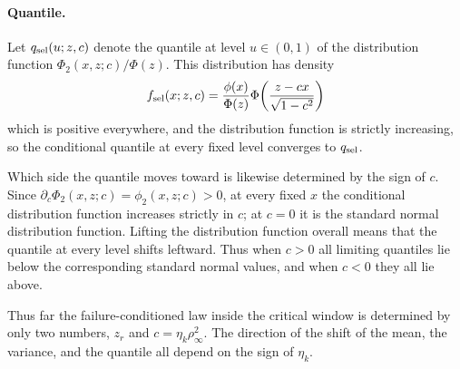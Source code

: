 \paragraph{Quantile.}
Let $q_{\rm sel}(u;z,c)$ denote the quantile at level $u\in(0,1)$ of the distribution function $\Phi_2(x,z;c)/\Phi(z)$. This
distribution has density
\begin{equation*}
f_{\rm sel}(x;z,c)=\frac{\phi(x)}{\Phi(z)}
\Phi\!\left(\frac{z-cx}{\sqrt{1-c^2}}\right)
\end{equation*}
which is positive everywhere, and the distribution function is strictly increasing, so the conditional quantile at every fixed level
converges to $q_{\rm sel}$.

Which side the quantile moves toward is likewise determined by the sign of $c$. Since
$\partial_c\Phi_2(x,z;c)=\phi_2(x,z;c)>0$, at every fixed $x$ the conditional distribution function increases strictly in $c$; at
$c=0$ it is the standard normal distribution function. Lifting the distribution function overall means that the quantile at every
level shifts leftward. Thus when $c>0$ all limiting quantiles lie below the corresponding standard normal values, and when $c<0$
they all lie above.

Thus far the failure-conditioned law inside the critical window is determined by only two numbers, $z_r$ and
$c=\eta_k\rho_\infty^2$. The direction of the shift of the mean, the variance, and the quantile all depend on the sign of $\eta_k$.
